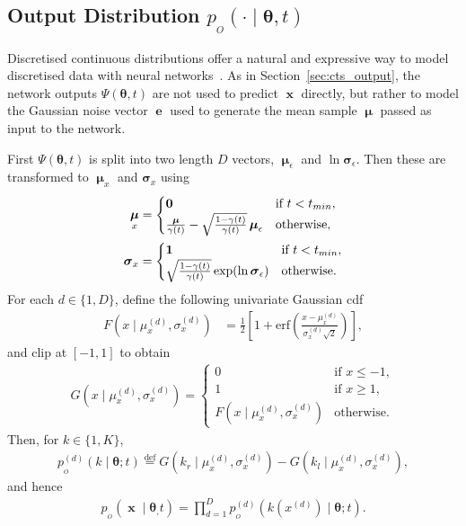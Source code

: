 \documentclass[11pt,table]{article}
\DeclareMathOperator{\x}{\mathbf{x}}
\DeclareMathOperator{\e}{\mathbf{e}}
\DeclareMathOperator{\m}{\boldsymbol{\mu}}
\newcommand*{\defeq}{\stackrel{\text{def}}{=}}
\newcommand{\tidx}[2]{#1_{#2}}
\newcommand{\didx}[2]{#1^{(#2)}}
\renewcommand{\vec}[1]{\boldsymbol{#1}}
\newcommand{\pars}{\theta}
\newcommand{\parsn}{\vec{\pars}}
\newcommand{\parsnt}[1]{\tidx{\parsn}{#1}}
\newcommand{\0}[1]{\constvec{0}{#1}}
\newcommand{\1}[1]{\constvec{1}{#1}}
\newcommand{\xdd}[1]{\didx{x}{#1}}
\newcommand{\ds}[1]{\{1,#1\}}
\def\net{\Psi\xspace}
\newcommand{\out}{p_{_O}}
\begin{document}
\subsection{Output Distribution \texorpdfstring{$\out(\cdot \mid \parsn, t)$}{}}\label{sec:discd_output}
Discretised continuous distributions offer a natural and expressive way to model discretised data with neural networks~\cite{salimans2017pixel}. 
As in Section~\ref{sec:cts_output}, the network outputs $\net(\parsn, t)$ are not used to predict $\x$ directly, but rather to model the Gaussian noise vector $\e$ used to generate the mean sample $\m$ passed as input to the network.

First $\net(\parsn, t)$ is split into two length $D$ vectors, $\m_{\epsilon}$ and $\ln \vec{\sigma}_{\epsilon}$.
Then these are transformed to $\m_{x}$ and $\vec{\sigma}_{x}$ using
\begin{align}
\m_{x} &= \begin{cases}\0{D} & \text{if $t < t_{min}$},\\ \frac{\m}{\gamma(t)} - \sqrt{\frac{1-\gamma(t)}{\gamma(t)}}\m_{\epsilon} & \text{otherwise},\end{cases}\\
\vec{\sigma}_{x} &= \begin{cases}\1{D} & \text{if $t < t_{min}$},\\ \sqrt{\frac{1-\gamma(t)}{\gamma(t)}}\exp(\ln \vec{\sigma}_{\epsilon}) & \text{otherwise}.\end{cases}
\end{align}
For each $d \in \ds{D}$, define the following univariate Gaussian cdf
\begin{align}
F\left(x \mid \mu_x^{(d)}, \sigma_x^{(d)}\right) &= \frac{1}{2}\left[1+\text{erf}\left( \frac{x - \mu_x^{(d)}}{\sigma_x^{(d)}\sqrt{2}}\right)\right],
\end{align}
and clip at $[-1, 1]$ to obtain
\begin{align}
G\left(x \mid \mu_x^{(d)}, \sigma_x^{(d)}\right) = \begin{cases}
0&\text{if $x \leq -1$},\\
1&\text{if  $x \geq 1$},\\
F\left(x \mid \mu_x^{(d)}, \sigma_x^{(d)}\right)&\text{otherwise}.
\end{cases}
\end{align}
Then, for $k \in \ds{K}$,
\begin{align}
\out^{(d)}(k \mid \parsn; t) \defeq G(k_r\mid  \mu^{(d)}_x, \sigma^{(d)}_x)-G(k_l\mid  \mu^{(d)}_x, \sigma^{(d)}_x),
\end{align}
and hence
\begin{align}
\out(\x \mid \parsnt, t) =
\prod_{d=1}^D \out^{(d)}\left(k(\xdd{d})\mid \parsn; t\right).\label{discd_p_dist}
\end{align}
\end{document}
